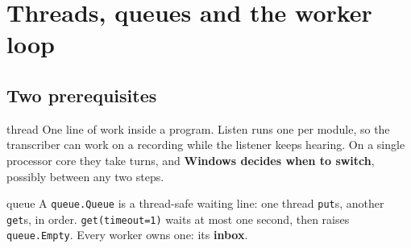 \documentclass[11pt,a4paper]{article}
\begin{document}
\section{Threads, queues and the worker loop}\label{sec:worker}
\subsection{Two prerequisites}
\begin{concept}{thread}
One line of work inside a program. Listen runs one per module, so the transcriber can work on a
recording while the listener keeps hearing. On a single processor core they take turns, and
\textbf{Windows decides when to switch}, possibly between any two steps.
\end{concept}
\begin{concept}{queue}
A \texttt{queue.Queue} is a thread-safe waiting line: one thread \texttt{put}s, another
\texttt{get}s, in order. \texttt{get(timeout=1)} waits at most one second, then raises
\texttt{queue.Empty}. Every worker owns one: its \textbf{inbox}.
\end{concept}
\end{document}
